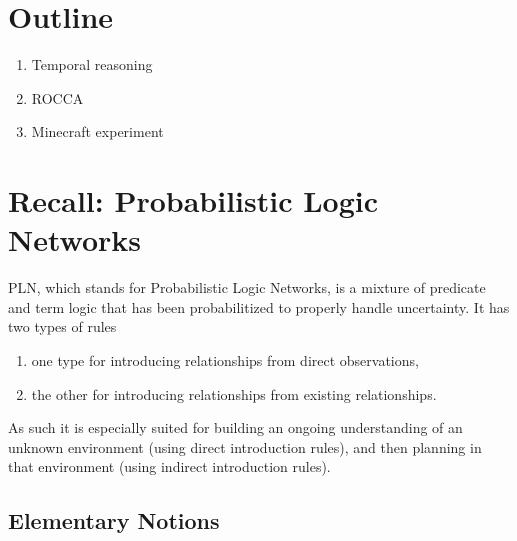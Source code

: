 \documentclass[runningheads]{llncs}
\begin{document}
\section{Outline}

\begin{enumerate}
\item Temporal reasoning
\item ROCCA
\item Minecraft experiment
\end{enumerate}

\section{Recall: Probabilistic Logic Networks}

PLN, which stands for Probabilistic Logic Networks, is a mixture of
predicate and term logic that has been probabilitized to properly
handle uncertainty.  It has two types of rules
\begin{enumerate}
\item one type for introducing relationships from direct observations,
\item the other for introducing relationships from existing
  relationships.
\end{enumerate}
As such it is especially suited for building an ongoing understanding
of an unknown environment (using direct introduction rules), and then
planning in that environment (using indirect introduction rules).

\subsection{Elementary Notions}

\end{document}
